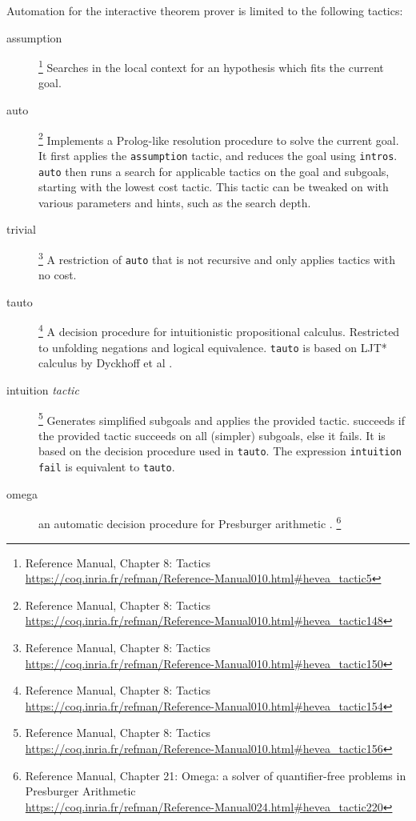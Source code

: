 Automation for the \coq interactive theorem prover is limited to the following tactics:
\begin{description}
\item[assumption]
  \footnote{
    \coq Reference Manual, Chapter 8:
    Tactics\\
    \url{https://coq.inria.fr/refman/Reference-Manual010.html\#hevea_tactic5}
  }
  Searches in the local context for an hypothesis which fits the current goal.
\item[auto]
  \footnote{
    \coq Reference Manual, Chapter 8:
    Tactics\\
    \url{https://coq.inria.fr/refman/Reference-Manual010.html\#hevea_tactic148}
  }
  Implements a Prolog-like resolution procedure to solve the current goal.
  It first applies the \texttt{assumption} tactic, and reduces the goal using \texttt{intros}.
  \texttt{auto} then runs a search for applicable tactics on the goal and subgoals, starting with the lowest cost tactic.
  This tactic can be tweaked on with various parameters and hints, such as the search depth.
\item[trivial]
  \footnote{
    \coq Reference Manual, Chapter 8:
    Tactics\\
    \url{https://coq.inria.fr/refman/Reference-Manual010.html\#hevea_tactic150}
  }
  A restriction of \texttt{auto} that is not recursive and only applies tactics with no cost.
\item[tauto]
  \footnote{
    \coq Reference Manual, Chapter 8:
    Tactics\\
    \url{https://coq.inria.fr/refman/Reference-Manual010.html\#hevea_tactic154}
  }
  A decision procedure for intuitionistic propositional calculus.
  Restricted to unfolding negations and logical equivalence.
  \texttt{tauto} is based on LJT* calculus by Dyckhoff et al \cite{dyckhoff1992contraction}.
\item[intuition \emph{tactic}]
  \footnote{
    \coq Reference Manual, Chapter 8:
    Tactics\\
    \url{https://coq.inria.fr/refman/Reference-Manual010.html\#hevea_tactic156}
  }
  Generates simplified subgoals and applies the provided tactic.
   succeeds if the provided tactic succeeds on all (simpler) subgoals, else it fails.
  It is based on the decision procedure used in \texttt{tauto}.
  The expression \texttt{intuition fail} is equivalent to \texttt{tauto}.
\item[omega]
  an automatic decision procedure for Presburger arithmetic \cite{stansifer1984presburger}.%
  \footnote{
    \coq Reference Manual, Chapter 21:
    Omega: a solver of quantifier-free problems in Presburger Arithmetic\\
    \url{https://coq.inria.fr/refman/Reference-Manual024.html\#hevea_tactic220}
  }
\end{description}


